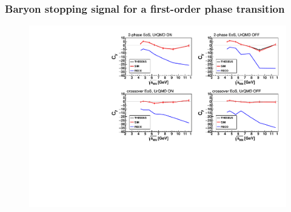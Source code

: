 \documentclass[dvipsnames] {beamer}
\begin{document}
\begin{frame}
  \frametitle{{\small Baryon stopping signal for a first-order phase transition}}
  \begin{block}{}
     \begin{figure}[H]
       \includegraphics[width=.9\textwidth]{Cy_comparision_noCuts_central.pdf}
     \end{figure}     
  \end{block} 
\end{frame}


\begin{frame}
 
\end{frame}
\end{document}
